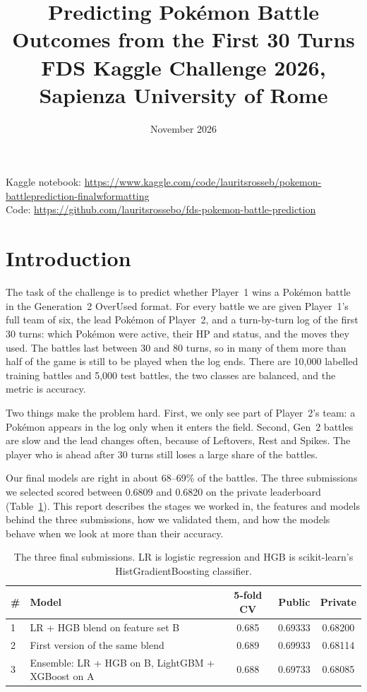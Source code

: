 \documentclass[11pt,a4paper]{article}
\title{Predicting Pokémon Battle Outcomes from the First 30 Turns\\[4pt]
\large FDS Kaggle Challenge 2026, Sapienza University of Rome}
\author{\teammembers}
\date{November 2026}
\newcommand{\kagglenotebook}{\url{https://www.kaggle.com/code/lauritsrosseb/pokemon-battleprediction-finalwformatting}}
\newcommand{\githubrepo}{https://github.com/lauritsrossebo/fds-pokemon-battle-prediction}
\begin{document}
\maketitle
\vspace{-1.2em}
\begin{center}
\small Kaggle notebook: \kagglenotebook\\
Code: \url{\githubrepo}
\end{center}

\section{Introduction}

The task of the challenge is to predict whether Player~1 wins a Pokémon battle in the Generation~2
OverUsed format. For every battle we are given Player~1's full team of six, the lead Pokémon of
Player~2, and a turn-by-turn log of the first 30 turns: which Pokémon were active, their HP and
status, and the moves they used. The battles last between 30 and 80 turns, so in many of them more
than half of the game is still to be played when the log ends. There are 10,000 labelled training
battles and 5,000 test battles, the two classes are balanced, and the metric is accuracy.

Two things make the problem hard. First, we only see part of Player~2's team: a Pokémon appears in
the log only when it enters the field. Second, Gen~2 battles are slow and the lead changes often,
because of Leftovers, Rest and Spikes. The player who is ahead after 30 turns still loses a large
share of the battles.

Our final models are right in about 68--69\% of the battles. The three submissions we selected
scored between 0.6809 and 0.6820 on the private leaderboard (Table~\ref{tab:final}). This report
describes the stages we worked in, the features and models behind the three submissions, how we
validated them, and how the models behave when we look at more than their accuracy.

\begin{table}[H]
\centering\small
\begin{tabular}{@{}llccc@{}}
\toprule
\# & Model & 5-fold CV & Public & Private \\
\midrule
1 & LR + HGB blend on feature set B & 0.685 & 0.69333 & 0.68200 \\
2 & First version of the same blend & 0.689 & 0.69933 & 0.68114 \\
3 & Ensemble: LR + HGB on B, LightGBM + XGBoost on A & 0.688 & 0.69733 & 0.68085 \\
\bottomrule
\end{tabular}
\caption{The three final submissions. LR is logistic regression and HGB is scikit-learn's
HistGradientBoosting classifier.}
\label{tab:final}
\end{table}
\end{document}
